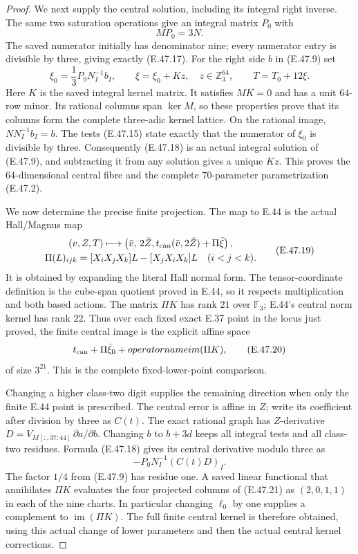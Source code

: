 \begin{proof}
We next supply the central solution, including
its integral right inverse.  The same two
saturation operations give an integral matrix
$P_0$ with
\[
                        M P_0=3N.
 \tag{E.47.17}
\]
The saved numerator initially has denominator
nine; every numerator entry is divisible by
three, giving exactly \textup{(E.47.17)}.
For the right side $b$ in \textup{(E.47.9)} set
\[
 \xi_0=\frac13P_0N_I^{-1}b_I,\qquad
 \xi=\xi_0+Kz,\quad z\in\mathbb Z_3^{64},
 \qquad T=T_0+12\xi.
 \tag{E.47.18}
\]
Here $K$ is the saved integral kernel matrix.
It satisfies $MK=0$ and has a unit $64$-row
minor.  Its rational columns span $\ker M$, so
these properties prove that its columns form
the complete three-adic kernel lattice.
On the rational image, $NN_I^{-1}b_I=b$.
The tests \textup{(E.47.15)} state exactly that
the numerator of $\xi_0$ is divisible by three.
Consequently \textup{(E.47.18)} is an actual
integral solution of \textup{(E.47.9)}, and
subtracting it from any solution gives a unique
$Kz$.  This proves the $64$-dimensional central
fibre and the complete $70$-parameter
parametrization \textup{(E.47.2)}.

We now determine the precise finite projection.
The map to E.44 is the actual Hall/Magnus map
\[
 \begin{gathered}
 (v,Z,T)\longmapsto
 \left(\bar v,\,2\bar Z,
       t_{\rm can}(\bar v,2\bar Z)+\Pi\bar\xi\right),
 \\
 \Pi(L)_{ijk}=[X_iX_jX_k]L-[X_jX_iX_k]L
                  \quad(i<j<k).
 \end{gathered}
 \tag{E.47.19}
\]
It is obtained by expanding the literal Hall
normal form.  The tensor-coordinate definition
is the cube-span quotient proved in E.44, so
it respects multiplication and both based
actions.  The matrix $\Pi K$ has rank $21$
over $\mathbb F_3$; E.44's central norm kernel
has rank $22$.  Thus over each fixed exact
E.37 point in the locus just proved, the
finite central image is the explicit affine
space
\[
      t_{\rm can}+\Pi\bar\xi_0+operatorname{im}(\Pi K),
 \tag{E.47.20}
\]
of size $3^{21}$.  This is the complete
fixed-lower-point comparison.

Changing a higher class-two digit supplies the
remaining direction when only the finite E.44
point is prescribed.  The central error is
affine in $Z$; write its coefficient after
division by three as $C(t)$.  The exact rational
graph has $Z$-derivative
$D=V_M{}_{[:,37:44]}\,\partial a/\partial b$.
Changing $b$ to $b+3d$ keeps all integral tests
and all class-two residues.  Formula
\textup{(E.47.18)} gives its central derivative
modulo three as
\[
                   -P_0N_I^{-1}(C(t)D)_I.
 \tag{E.47.21}
\]
The factor $1/4$ from \textup{(E.47.9)} has
residue one.  A saved linear functional that
annihilates $\Pi K$ evaluates the four projected
columns of \textup{(E.47.21)} as $(2,0,1,1)$
in each of the nine charts.  In particular
changing $\ell_0$ by one supplies a complement
to $\operatorname{im}(\Pi K)$.  The full finite
central kernel is therefore obtained, using
this actual change of lower parameters and
then the actual central kernel corrections.


\end{proof}
